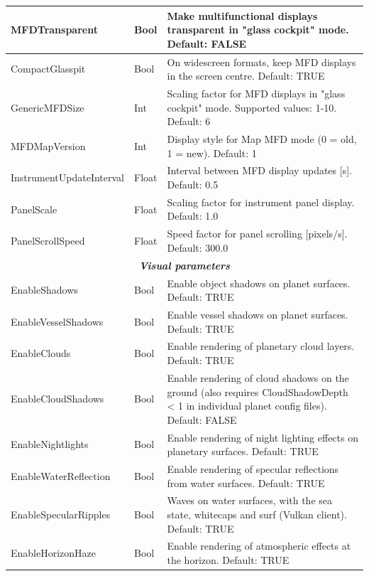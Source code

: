 \documentclass[Orbiter User Manual.tex]{subfiles}
\begin{document}
\begin{longtable}{ |p{}|p{}|p{}| }
	\hline\rule{0pt}{2ex}
	MFDTransparent & Bool & Make multifunctional displays transparent in "glass cockpit" mode. Default: FALSE\\
	\hline\rule{0pt}{2ex}
	CompactGlasspit & Bool & On widescreen formats, keep MFD displays in the screen centre. Default: TRUE\\
	\hline\rule{0pt}{2ex}
	GenericMFDSize & Int & Scaling factor for MFD displays in "glass cockpit" mode. Supported values: 1-10. Default: 6\\
	\hline\rule{0pt}{2ex}
	MFDMapVersion & Int & Display style for Map MFD mode (0 = old, 1 = new). Default: 1\\
	\hline\rule{0pt}{2ex}
	InstrumentUpdateInterval & Float & Interval between MFD display updates [s]. Default: 0.5\\
	\hline\rule{0pt}{2ex}
	PanelScale & Float & Scaling factor for instrument panel display. Default: 1.0\\
	\hline\rule{0pt}{2ex}
	PanelScrollSpeed & Float & Speed factor for panel scrolling [pixels/s]. Default: 300.0\\
	\hline
	\multicolumn{3}{|c|}{\rule{0pt}{2ex}\textbf{\textit{Visual parameters}}}\\
	\hline\rule{0pt}{2ex}
	EnableShadows & Bool & Enable object shadows on planet surfaces. Default: TRUE\\
	\hline\rule{0pt}{2ex}
	EnableVesselShadows & Bool & Enable vessel shadows on planet surfaces. Default: TRUE\\
	\hline\rule{0pt}{2ex}
	EnableClouds & Bool & Enable rendering of planetary cloud layers. Default: TRUE\\
	\hline\rule{0pt}{2ex}
	EnableCloudShadows & Bool & Enable rendering of cloud shadows on the ground (also requires CloudShadowDepth < 1 in individual planet config files). Default: FALSE\\
	\hline\rule{0pt}{2ex}
	EnableNightlights & Bool & Enable rendering of night lighting effects on planetary surfaces. Default: TRUE\\
	\hline\rule{0pt}{2ex}
	EnableWaterReflection & Bool & Enable rendering of specular reflections from water surfaces. Default: TRUE\\
	\hline\rule{0pt}{2ex}
	EnableSpecularRipples & Bool & Waves on water surfaces, with the sea state, whitecaps and surf (Vulkan client). Default: TRUE\\
	\hline\rule{0pt}{2ex}
	EnableHorizonHaze & Bool & Enable rendering of atmospheric effects at the horizon. Default: TRUE\\

\end{longtable}
\end{document}
